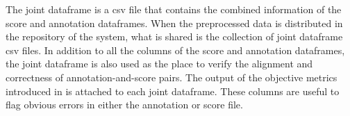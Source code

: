 
The joint dataframe is a \gls{csv} file that contains the
combined information of the score and annotation dataframes.
When the preprocessed data is distributed in the repository
of the system, what is shared is the collection of joint
dataframe \gls{csv} files. In addition to all the columns of
the score and annotation dataframes, the joint dataframe is
also used as the place to verify the alignment and
correctness of annotation-and-score pairs. The output of the
objective metrics introduced in
 is attached to each joint
dataframe. These columns are useful to flag obvious errors
in either the annotation or score file.
